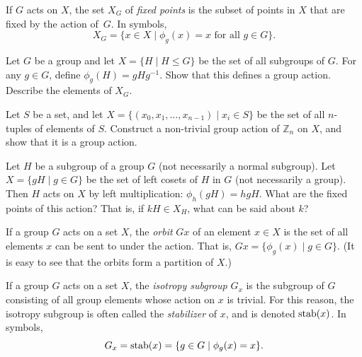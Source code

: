 \begin{definition}
 If $G$ acts on $X$, the set $X_G$ of \emph{fixed points} is the subset of points in $X$ that are fixed by the action of~$G$. In symbols, $$X_G =\{ x \in X \mid \phi_g(x) = x \mbox{ for all } g \in G \}.$$
\end{definition}

\begin{problem}
Let $G$ be a group and let $X = \{ H \mid H \leq G\}$ be the set of all subgroups of $G$.  For any $g \in G$, define $\phi_g(H) = gHg^{-1}$.  Show that this defines a group action.  Describe the elements of $X_G$.
\end{problem}



\begin{problem}
Let $S$ be a set, and let $X = \{(x_0, x_1, \ldots, x_{n-1}) \mid x_i \in S \}$ be the set of all $n$-tuples of elements of $S$.  Construct a non-trivial group action of $\mathbb{Z}_n$ on $X$, and show that it is a group action.
\end{problem}



\begin{problem}
Let $H$ be a subgroup of a group $G$ (not necessarily a normal subgroup).  Let $X = \{gH \mid g\in G\}$ be the set of left cosets of $H$ in $G$ (not necessarily a group).  Then $H$ acts on $X$ by left multiplication: $\phi_h(gH) = hgH$.  What are the fixed points of this action?  That is, if $kH \in X_H$, what can be said about $k$?
\end{problem}



\begin{definition}
 If a group $G$ acts on a set $X$, the \emph{orbit} $Gx$ of an element $x \in X$ is the set of all elements $x$ can be sent to under the action.  That is, $Gx = \{ \phi_g(x) \mid g \in G \}$.  (It is easy to see that the orbits form a partition of $X$.)
\end{definition}

\begin{definition}
 If a group $G$ acts on a set $X$, the \emph{isotropy subgroup} $G_x$ is the subgroup of $G$ consisting of all group elements whose action on $x$ is trivial.  For this reason, the isotropy subgroup is often called the \emph{stabilizer} of $x$, and is denoted $\operatorname{stab}(x)$.  In symbols,
 $$G_x = \operatorname{stab}(x) = \{ g \in G \mid \phi_g(x) = x \}.$$
\end{definition}


